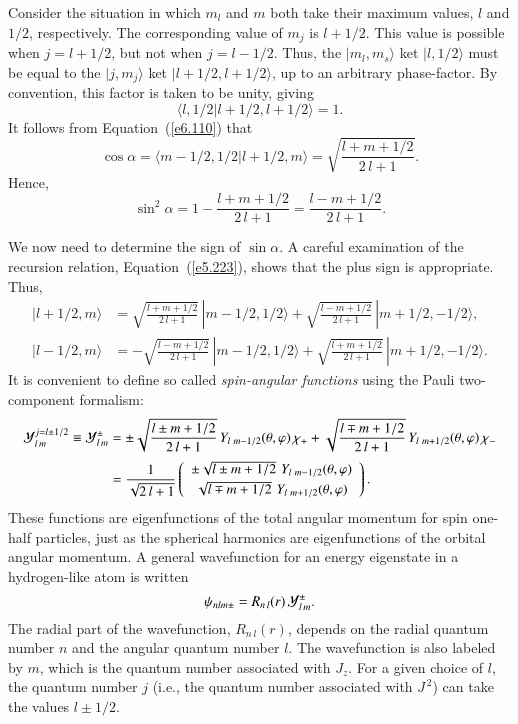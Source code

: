 Consider the situation in which $m_l$ and $m$ both take their maximum values,
$l$ and $1/2$, respectively. The corresponding value of $m_j$ is
$l+1/2$. This value is possible when  $j=l+1/2$, but not when $j=l-1/2$. 
Thus, the $|m_l, m_s\rangle$ ket $|l,1/2\rangle$ must be equal to
the $|j,m_j\rangle$ ket $|l+1/2, l+1/2\rangle$, up to an arbitrary phase-factor.
By convention, this factor is taken to be unity, giving
\begin{equation}
\langle l, 1/2|l+1/2, l+1/2\rangle = 1.
\end{equation}
It follows from Equation~(\ref{e6.110}) that
\begin{equation}
\cos\alpha=\langle m-1/2, 1/2|l+1/2, m\rangle = \sqrt{\frac{l+m+1/2}{2\,l+1}}.
\end{equation}
Hence, 
\begin{equation}
\sin^2\alpha = 1 - \frac{l+m+1/2}{2\,l+1} = \frac{l-m+1/2}{2\,l+1}.
\end{equation}

We now need to determine the sign of $\sin\alpha$. A careful examination 
of the recursion relation, Equation~(\ref{e5.223}), shows that the plus sign is
appropriate. Thus,
\begin{align}
|l+1/2, m\rangle &=\sqrt{\frac{l+m+1/2}{2\,l+1}}\,|m-1/2, 1/2\rangle+\sqrt{\frac{l-m+1/2}{2\,l+1}}\,|m+1/2, -1/2\rangle,\label{e6.114}\\[0.5ex]
|l-1/2, m\rangle &= - \sqrt{\frac{l-m+1/2}{2\,l+1}} \,|m-1/2,1/2\rangle
+  \sqrt{\frac{l+m+1/2}{2\,l+1}} \,|m+1/2, -1/2\rangle.\label{e6.115}
\end{align}
It is convenient to define so called {\em spin-angular functions} using the
Pauli two-component formalism:
\begin{align}
{\cal Y}_{l\,m}^{j=l\pm 1/2}\equiv {\cal Y}_{l\,m}^{\pm} &= \pm \sqrt{\frac{l\pm m+1/2}{2\,l+1}}\,
Y_{l\,\,m-1/2}(\theta, \varphi) \,\chi_+ +\sqrt{\frac{l\mp m+1/2}{2\,l+1}} \,Y_{l\,\,m+1/2}(\theta,\varphi)\, \chi_-
\nonumber\\[0.5ex]
&= \frac{1}{\sqrt{2\,l+1}}\left( \begin{array}{c}
\pm \sqrt{l\pm m +1/2}\,\,Y_{l\,\,m-1/2}(\theta,\varphi)\\[0.5ex]
\sqrt{l\mp m+1/2}\,\,Y_{l\,\,m+1/2}(\theta, \varphi) \end{array}
\right).
\end{align}
These functions are eigenfunctions of the total angular momentum for spin
one-half particles, just as the spherical harmonics are  eigenfunctions
of the orbital angular momentum. A general wavefunction for an energy
eigenstate in a hydrogen-like atom is written
\begin{equation}\label{e6.117}
\psi_{nlm\pm} = R_{n\,l}(r)\, {\cal Y}_{l\,m}^\pm.
\end{equation}
The radial part of the wavefunction, $R_{n\,l}(r)$, depends on the radial
quantum number $n$ and the angular quantum number $l$. The wavefunction 
is also
labeled by $m$, which is the quantum number associated with $J_z$. 
For a given choice of $l$, the quantum number $j$
({\rm i.e.}, the quantum number associated with $J^{\,2}$) can take the values
 $l\pm 1/2$.  

